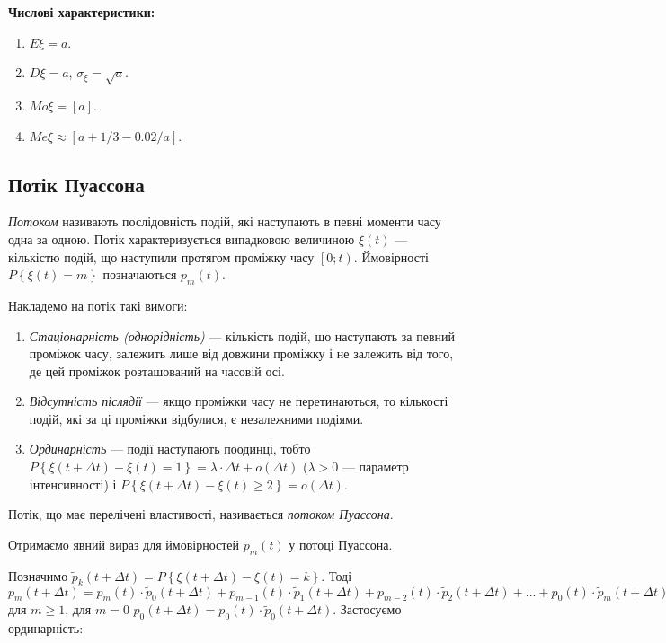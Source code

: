 \noindent\textbf{Числові характеристики:}
\begin{enumerate}
    \item $E\xi = a$.
    \item $D\xi = a$, $\sigma_\xi = \sqrt{a}$.
    \item ${Mo}\xi = \left[a\right]$.
    \item ${Me}\xi \approx \left[a + 1/3 - 0.02/a\right]$.
\end{enumerate}

\subsection{Потік Пуассона}
\emph{Потоком} називають послідовність подій, які наступають в певні моменти часу одна за одною.
Потік характеризується випадковою величиною $\xi(t)$ --- 
кількістю подій, що наступили протягом проміжку часу $\left[ 0; t\right)$.
Ймовірності $P\left\{\xi(t) = m\right\}$ позначаються $p_m(t)$.

Накладемо на потік такі вимоги:
\begin{enumerate}
    \item \emph{Стаціонарність (однорідність)} --- кількість подій, що наступають
    за певний проміжок часу, залежить лише від довжини проміжку і не залежить
    від того, де цей проміжок розташований на часовій осі.
    \item \emph{Відсутність післядії} --- якщо проміжки часу не перетинаються, то кількості подій,
    які за ці проміжки відбулися, є незалежними подіями.
    \item \emph{Ординарність} --- події наступають поодинці, тобто
    $P\left\{\xi(t+\Delta t) - \xi(t) = 1\right\} = \lambda\cdot\Delta t + o(\Delta t)$
    ($\lambda > 0$ --- параметр інтенсивності) і 
    $P\left\{\xi(t+\Delta t) - \xi(t) \geq 2\right\} = o(\Delta t)$.
\end{enumerate}
\begin{definition}
    Потік, що має перелічені властивості, називається \emph{потоком Пуассона}.
\end{definition}
Отримаємо явний вираз для ймовірностей $p_m(t)$ у потоці Пуассона.

Позначимо $\tilde{p}_k(t+\Delta t) = P\left\{\xi(t+\Delta t) - \xi(t) = k\right\}$.
Тоді $p_m(t+\Delta t) = p_m(t)\cdot \tilde{p}_0(t+\Delta t) + p_{m-1}(t)\cdot \tilde{p}_1(t+\Delta t) +
p_{m-2}(t)\cdot \tilde{p}_2(t+\Delta t) + ... + p_0(t)\cdot \tilde{p}_m(t+\Delta t)$ для $m \geq 1$,
для $m=0$ $p_0(t+\Delta t) = p_0(t)\cdot\tilde{p}_0(t+\Delta t)$. Застосуємо ординарність:

